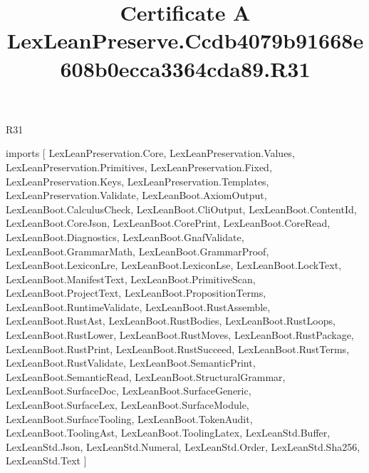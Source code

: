 \begin{lexlean}{R31}
\title{Certificate A LexLeanPreserve.Ccdb4079b91668e608b0ecca3364cda89.R31}
\begin{coremodule}
imports [
  LexLeanPreservation.Core,
  LexLeanPreservation.Values,
  LexLeanPreservation.Primitives,
  LexLeanPreservation.Fixed,
  LexLeanPreservation.Keys,
  LexLeanPreservation.Templates,
  LexLeanPreservation.Validate,
  LexLeanBoot.AxiomOutput,
  LexLeanBoot.CalculusCheck,
  LexLeanBoot.CliOutput,
  LexLeanBoot.ContentId,
  LexLeanBoot.CoreJson,
  LexLeanBoot.CorePrint,
  LexLeanBoot.CoreRead,
  LexLeanBoot.Diagnostics,
  LexLeanBoot.GnafValidate,
  LexLeanBoot.GrammarMath,
  LexLeanBoot.GrammarProof,
  LexLeanBoot.LexiconLre,
  LexLeanBoot.LexiconLse,
  LexLeanBoot.LockText,
  LexLeanBoot.ManifestText,
  LexLeanBoot.PrimitiveScan,
  LexLeanBoot.ProjectText,
  LexLeanBoot.PropositionTerms,
  LexLeanBoot.RuntimeValidate,
  LexLeanBoot.RustAssemble,
  LexLeanBoot.RustAst,
  LexLeanBoot.RustBodies,
  LexLeanBoot.RustLoops,
  LexLeanBoot.RustLower,
  LexLeanBoot.RustMoves,
  LexLeanBoot.RustPackage,
  LexLeanBoot.RustPrint,
  LexLeanBoot.RustSucceed,
  LexLeanBoot.RustTerms,
  LexLeanBoot.RustValidate,
  LexLeanBoot.SemanticPrint,
  LexLeanBoot.SemanticRead,
  LexLeanBoot.StructuralGrammar,
  LexLeanBoot.SurfaceDoc,
  LexLeanBoot.SurfaceGeneric,
  LexLeanBoot.SurfaceLex,
  LexLeanBoot.SurfaceModule,
  LexLeanBoot.SurfaceTooling,
  LexLeanBoot.TokenAudit,
  LexLeanBoot.ToolingAst,
  LexLeanBoot.ToolingLatex,
  LexLeanStd.Buffer,
  LexLeanStd.Json,
  LexLeanStd.Numeral,
  LexLeanStd.Order,
  LexLeanStd.Sha256,
  LexLeanStd.Text
]


\end{coremodule}
\end{lexlean}
